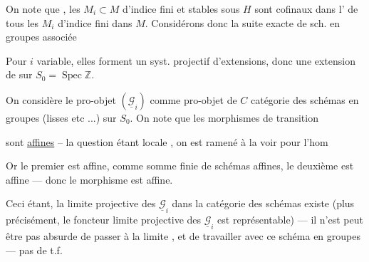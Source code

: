 
On note que ,
 les $M_i\subset M$ d'indice fini et stables sous $H$
sont cofinaux dans l' de tous les $M_i$ d'indice fini dans
$M$. Considérons donc la suite exacte de sch. en groupes associée



Pour $i$ variable, elles forment un syst. projectif d'extensions,
donc une extension de  sur $S_0=\operatorname{Spec}\mathbb Z$.



On considère le pro-objet $(\underline{\mathcal G}_i)$ comme pro-objet
de $C$ catégorie des schémas en groupes (lisses etc ...) sur $S_0$.
On note que les morphismes de transition


sont \uline{affines} -- la question étant locale
, on est ramené à la voir pour
l'hom




Or le premier est affine, comme somme finie de schémas affines, le deuxième est affine --- donc le morphisme est affine.

Ceci étant, la limite projective des $\underline{\mathcal{G}}_i$ dans la catégorie des schémas existe (plus précisément, le foncteur limite projective des $\underline{\mathcal{G}}_i$ est représentable) --- il n'est peut être pas absurde de passer à la limite , et de travailler avec ce schéma en groupes --- pas de t.f.

